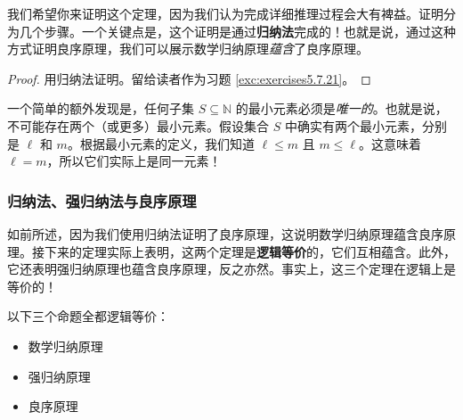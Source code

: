 我们希望你来证明这个定理，因为我们认为完成详细推理过程会大有裨益。证明分为几个步骤。一个关键点是，这个证明是通过\textbf{归纳法}完成的！也就是说，通过这种方式证明良序原理，我们可以展示数学归纳原理\emph{蕴含}了良序原理。

\begin{proof}
    用归纳法证明。留给读者作为习题 \ref{exc:exercises5.7.21}。
\end{proof}

一个简单的额外发现是，任何子集 $S \subseteq \mathbb{N}$ 的最小元素必须是\emph{唯一的}。也就是说，不可能存在两个（或更多）最小元素。假设集合 $S$ 中确实有两个最小元素，分别是 $\ell$ 和 $m$。根据最小元素的定义，我们知道 $\ell \le m$ 且 $m \le \ell$。这意味着 $\ell = m$，所以它们实际上是同一元素！

\subsubsection*{归纳法、强归纳法与良序原理}

如前所述，因为我们使用归纳法证明了良序原理，这说明数学归纳原理蕴含良序原理。接下来的定理实际上表明，这两个定理是\textbf{逻辑等价}的，它们互相蕴含。此外，它还表明强归纳原理也蕴含良序原理，反之亦然。事实上，这三个定理在逻辑上是等价的！

\begin{theorem}
    以下三个命题全都逻辑等价：
    \begin{itemize}
        \item 数学归纳原理
        \item 强归纳原理
        \item 良序原理
    \end{itemize}
\end{theorem}

